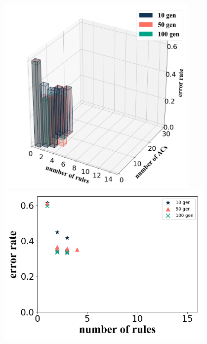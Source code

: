 \documentclass[conference]{IEEEtran}
\begin{document}
  \begin{figure}[H]
    \centering
    \begin{minipage}[t]{0.40\textwidth}
    \includegraphics[width=0.88\textwidth]{figures/diffGenTrain1.png}
    \end{minipage}
    \centering
    \begin{minipage}[t]{0.25\textwidth}
    \includegraphics[width=0.95\textwidth]{figures/diffGenTrain2.png}
    \end{minipage}%
    \centering
    \begin{minipage}[t]{0.25\textwidth}

\end{minipage}
\end{figure}
\end{document}
